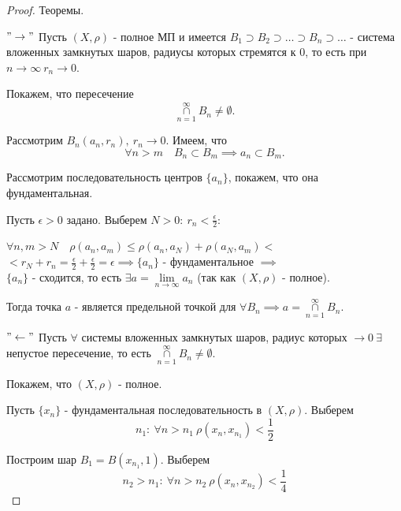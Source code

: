 \documentclass{report}
\theoremstyle{definition}
\begin{document}
\begin{proof}
  Теоремы.

  $"\rightarrow"$ Пусть $(X,\rho)$ - полное МП и имеется $B_1 \supset B_2 \supset \ldots
    \supset B_n \supset \ldots$ - система вложенных замкнутых шаров, радиусы которых стремятся к $0$, то есть
  при $n\rightarrow\infty \ r_n \rightarrow 0$.

  Покажем, что пересечение
  \begin{equation*}
    \underset{n=1}{\overset{\infty}{\cap}} B_n \ne \emptyset.
  \end{equation*}

  Рассмотрим $B_n(a_n,r_n), \ r_n \rightarrow 0$. Имеем, что
  \begin{equation*}
    \forall n>m \quad B_n\subset B_m \implies a_n \subset B_m.
  \end{equation*}

  Рассмотрим последовательность центров $\{a_n\}$, покажем, что она фундаментальная.

  Пусть $\epsilon > 0$ задано. Выберем $N>0: \ r_n < \frac{\epsilon}{2}:$
  \begin{center}
    $\forall n,m > N \quad \rho(a_n,a_m) \leqslant \rho(a_n,a_N) + \rho(a_N,a_m) <$ \\
    $< r_N + r_n = \frac{\epsilon}{2} + \frac{\epsilon}{2} = \epsilon \implies \{a_n\}$ - фундаментальное
    $\implies$ \\

    $\{a_n\}$ - сходится, то есть $\exists a = \underset{n\rightarrow\infty}{\lim}a_n$
    (так как $(X,\rho)$ - полное).
  \end{center}
  Тогда точка $a$ - является предельной точкой для $\forall B_n \implies a =
    \underset{n=1}{\overset{\infty}{\cap}} B_n$.

  $"\leftarrow"$ Пусть $\forall$ системы вложенных замкнутых шаров, радиус которых $\rightarrow 0 \ \exists$
  непустое пересечение, то есть $\underset{n=1}{\overset{\infty}{\cap}} B_n \ne \emptyset$.

  Покажем, что $(X,\rho)$ - полное.

  Пусть $\{x_n\}$ - фундаментальная последовательность в $(X,\rho)$. Выберем
  \begin{equation*}
    n_1 : \ \forall n > n_1 \ \rho (x_n, x_{n_1}) < \frac{1}{2}
  \end{equation*}

  Построим шар $B_1 = B(x_{n_1},1)$. Выберем
  \begin{equation*}
    n_2 > n_1: \ \forall n> n_2 \ \rho (x_n,x_{n_2}) < \frac{1}{4}
  \end{equation*}


\end{proof}
\end{document}
